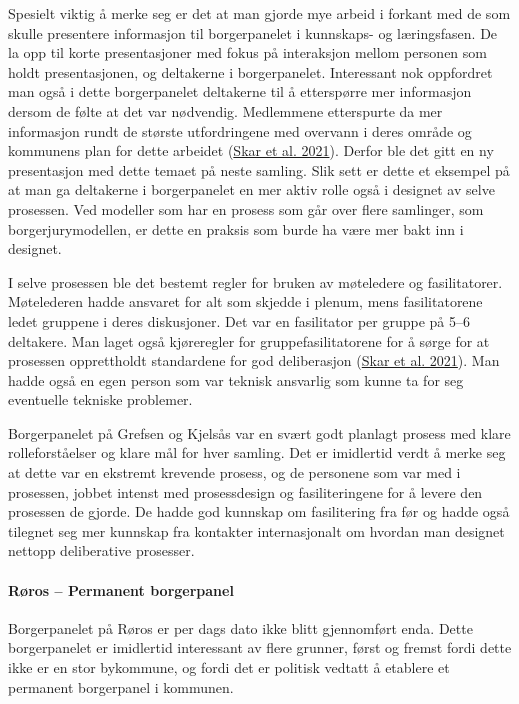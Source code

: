 \documentclass[
  12pt,
  a4paper, 12pt]{article}
\begin{document}
Spesielt viktig å merke seg er det at man gjorde mye arbeid i forkant med de som skulle presentere informasjon til borgerpanelet i kunnskaps- og læringsfasen. De la opp til korte presentasjoner med fokus på interaksjon mellom personen som holdt presentasjonen, og deltakerne i borgerpanelet. Interessant nok oppfordret man også i dette borgerpanelet deltakerne til å etterspørre mer informasjon dersom de følte at det var nødvendig. Medlemmene etterspurte da mer informasjon rundt de største utfordringene med overvann i deres område og kommunens plan for dette arbeidet (\protect\hyperlink{ref-skar_borgerpanel_2021}{Skar et al. 2021}). Derfor ble det gitt en ny presentasjon med dette temaet på neste samling. Slik sett er dette et eksempel på at man ga deltakerne i borgerpanelet en mer aktiv rolle også i designet av selve prosessen. Ved modeller som har en prosess som går over flere samlinger, som borgerjurymodellen, er dette en praksis som burde ha være mer bakt inn i designet.

I selve prosessen ble det bestemt regler for bruken av møteledere og fasilitatorer. Møtelederen hadde ansvaret for alt som skjedde i plenum, mens fasilitatorene ledet gruppene i deres diskusjoner. Det var en fasilitator per gruppe på 5--6 deltakere. Man laget også kjøreregler for gruppefasilitatorene for å sørge for at prosessen opprettholdt standardene for god deliberasjon (\protect\hyperlink{ref-skar_borgerpanel_2021}{Skar et al. 2021}). Man hadde også en egen person som var teknisk ansvarlig som kunne ta for seg eventuelle tekniske problemer.

Borgerpanelet på Grefsen og Kjelsås var en svært godt planlagt prosess med klare rolleforståelser og klare mål for hver samling. Det er imidlertid verdt å merke seg at dette var en ekstremt krevende prosess, og de personene som var med i prosessen, jobbet intenst med prosessdesign og fasiliteringene for å levere den prosessen de gjorde. De hadde god kunnskap om fasilitering fra før og hadde også tilegnet seg mer kunnskap fra kontakter internasjonalt om hvordan man designet nettopp deliberative prosesser.

\hypertarget{ruxf8ros-permanent-borgerpanel}{%
\paragraph{Røros -- Permanent borgerpanel}\label{ruxf8ros-permanent-borgerpanel}}

Borgerpanelet på Røros er per dags dato ikke blitt gjennomført enda. Dette borgerpanelet er imidlertid interessant av flere grunner, først og fremst fordi dette ikke er en stor bykommune, og fordi det er politisk vedtatt å etablere et permanent borgerpanel i kommunen.
\end{document}
